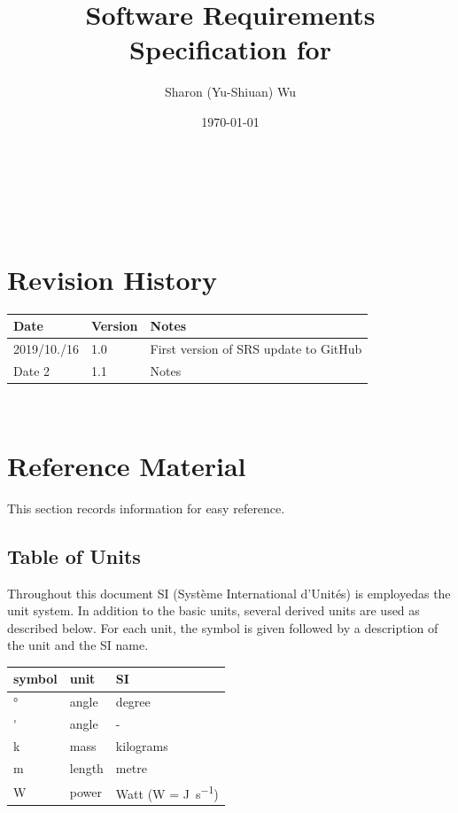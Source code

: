 \documentclass[12pt]{article}
\begin{document}
\title{Software Requirements Specification for \progname} 
\author{Sharon (Yu-Shiuan) Wu}
\date{\today}
	
\maketitle

~\newpage


\tableofcontents

~\newpage

\section*{Revision History}

\begin{tabularx}{\textwidth}{p{3cm}p{2cm}X}
\toprule {\bf Date} & {\bf Version} & {\bf Notes}\\
\midrule
2019/10./16 & 1.0 & First version of SRS update to GitHub\\
Date 2 & 1.1 & Notes\\
\bottomrule
\end{tabularx}

~\newpage

\section{Reference Material}

This section records information for easy reference.

\subsection{Table of Units}

Throughout this document SI (Syst\`{e}me International d'Unit\'{e}s) is
employedas the unit system. In addition to the basic units, several derived
units are used as described below.  For each unit, the symbol is given 
followed by a description of the unit and the SI name.
~\newline

\renewcommand{\arraystretch}{1.2}
  \noindent \begin{tabular}{l l l} 
    \toprule		
    \textbf{symbol} & \textbf{unit} & \textbf{SI}\\
    \midrule 
    \si{\degree} & angle & degree\\
    \si{'} & angle	& - \\
    \si{k} & mass   & kilograms\\
    \si{m} &  length   & metre \\
    \si{\watt} & power & Watt (W = \si{\joule\per\second})\\
    \bottomrule
  \end{tabular}
\end{document}
